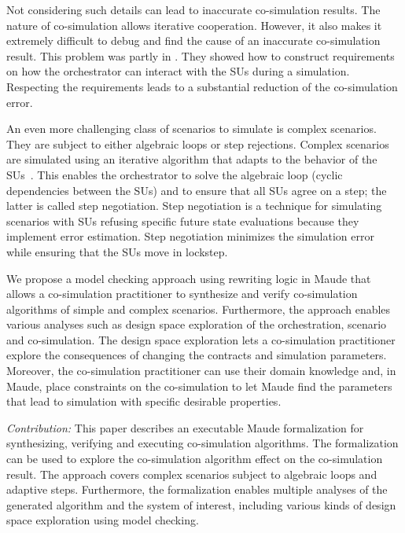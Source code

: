 Not considering such details can lead to inaccurate co-simulation results.
The nature of co-simulation allows iterative cooperation. 
However, it also makes it extremely difficult to debug and find the cause of an inaccurate co-simulation result.
This problem was partly in \cite{Gomes2019,Oakes2021}.
They showed how to construct requirements on how the orchestrator can interact with the SUs during a simulation. 
Respecting the requirements leads to a substantial reduction of the co-simulation error.

An even more challenging class of scenarios to simulate is complex scenarios.
They are subject to either algebraic loops or step rejections. 
Complex scenarios are simulated using an iterative algorithm that adapts to the behavior of the SUs~\cite{thrane2021}. 
This enables the orchestrator to solve the algebraic loop (cyclic dependencies between the SUs) and to ensure that all SUs agree on a step; the latter is called step negotiation. 
Step negotiation is a technique for simulating scenarios with SUs refusing specific future state evaluations because they implement error estimation.
Step negotiation minimizes the simulation error while ensuring that the SUs move in lockstep.

We propose a model checking approach using rewriting logic in Maude that
allows a co-simulation practitioner to synthesize and verify co-simulation algorithms of simple and complex scenarios.
Furthermore, the approach enables various analyses such as design space exploration of the orchestration, scenario and co-simulation.
The design space exploration lets a co-simulation practitioner explore the consequences of changing the contracts and simulation parameters.
Moreover, the co-simulation practitioner can use their domain knowledge and, in Maude, place constraints on the co-simulation to let Maude find the parameters that lead to simulation with specific desirable properties. 

\textit{Contribution:}
This paper describes an executable Maude formalization for synthesizing, verifying and executing co-simulation algorithms.
The formalization can be used to explore the co-simulation algorithm effect on the co-simulation result.
The approach covers complex scenarios subject to algebraic loops and adaptive steps.
Furthermore, the formalization enables multiple analyses of the generated algorithm and the system of interest, including various kinds of design space exploration using model checking. 

